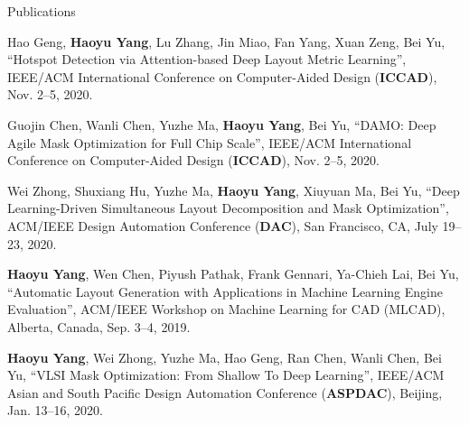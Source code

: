 \begin{rSection}{Publications}
\begin{description}[font=\normalfont]
    \item[{[C17]}] Hao Geng, \textbf{Haoyu Yang}, Lu Zhang, Jin Miao, Fan Yang, Xuan Zeng, Bei Yu, 
    ``Hotspot Detection via Attention-based Deep Layout Metric Learning'', 
    IEEE/ACM International Conference on Computer-Aided Design (\textbf{ICCAD}), Nov. 2–5, 2020.
    
    \item[{[C16]}] Guojin Chen, Wanli Chen, Yuzhe Ma, \textbf{Haoyu Yang}, Bei Yu,
     ``DAMO: Deep Agile Mask Optimization for Full Chip Scale'', 
     IEEE/ACM International Conference on Computer-Aided Design (\textbf{ICCAD}), Nov. 2–5, 2020.
	
	\item[{[C15]}] Wei Zhong, Shuxiang Hu, Yuzhe Ma, \textbf{Haoyu Yang}, Xiuyuan Ma, Bei Yu, 
	``Deep Learning-Driven Simultaneous Layout Decomposition and Mask Optimization'', 
	ACM/IEEE Design Automation Conference (\textbf{DAC}), San Francisco, CA, July 19–23, 2020.
	
	\item[{[C14]}] \textbf{Haoyu Yang}, Wen Chen, Piyush Pathak, Frank Gennari, Ya-Chieh Lai, Bei Yu, 
	``Automatic Layout Generation with Applications in Machine Learning Engine Evaluation'', 
	ACM/IEEE Workshop on Machine Learning for CAD (MLCAD), Alberta, Canada, Sep. 3–4, 2019.
	
	
	\item[{[C13]}] \textbf{Haoyu Yang}, Wei Zhong, Yuzhe Ma, Hao Geng, Ran Chen, Wanli Chen, Bei Yu,
	 ``VLSI Mask Optimization: From Shallow To Deep Learning'', 
	 IEEE/ACM Asian and South Pacific Design Automation Conference (\textbf{ASPDAC}), Beijing, Jan. 13–16, 2020.


\end{description}
\end{rSection}
